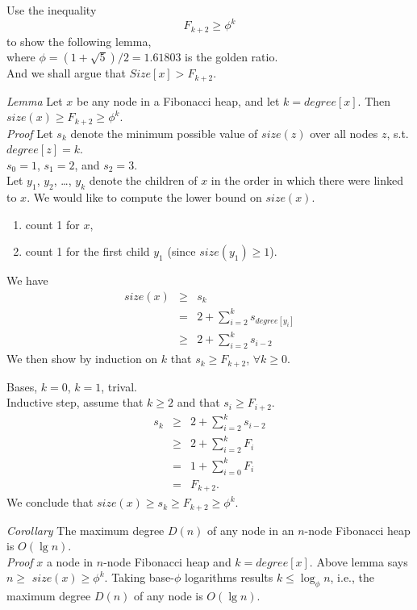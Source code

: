 \documentclass{beamer}
\begin{document}
\begin{frame}{}
Use the inequality $$F_{k+2}\ge \phi^k$$ to show the following lemma, \\
where $\phi=(1+\sqrt{5})/2=1.61803$ is the golden ratio. \\
And we shall argue that $Size[x] > F_{k+2}$.  
\end{frame}

\begin{frame}{}
{\it Lemma} Let $x$ be any node in a Fibonacci heap, and let $k=degree[x]$. Then $size(x) \ge F_{k+2}\ge \phi^k$. \\
{\it Proof} Let $s_k$ denote the minimum possible value of $size(z)$ over all nodes $z$, s.t. $degree[z]=k$. \\
$s_0=1$, $s_1=2$, and $s_2=3$. \\
Let $y_1$, $y_2$, \ldots, $y_k$ denote the children of $x$ in the order in which there were linked to $x$. We would like to compute the 
lower bound on $size(x)$. 
\begin{enumerate}
\item count 1 for $x$,
\item count 1 for the first child $y_1$ (since $size(y_1)\ge 1$). 
\end{enumerate}
\end{frame}

\begin{frame}{}
We have 
\begin{eqnarray}
size(x) &\ge& s_k \\
 & = & 2 + \sum_{i=2}^{k}s_{degree[y_i]} \\
 & \ge & 2 + \sum^k_{i=2}s_{i-2}
\end{eqnarray}
We then show by induction on $k$ that $s_k\ge F_{k+2}$, $\forall k\ge 0$. 
\end{frame}

\begin{frame}{}
Bases, $k=0$, $k=1$, trival. \\
Inductive step, assume that $k\ge 2$ and that $s_i\ge F_{i+2}$. 
\begin{eqnarray}
s_k &\ge& 2 + \sum^k_{i=2}s_{i-2} \\
 &\ge& 2 + \sum^k_{i=2} F_i \\
 & =& 1 + \sum^k_{i=0}F_i \\
 & = & F_{k+2}.
\end{eqnarray}
We conclude that $size(x)\ge s_k\ge F_{k+2}\ge \phi^k$. 
\end{frame}

\begin{frame}{}
\vspace{0.5cm}
{\it Corollary} The maximum degree $D(n)$ of any node in an $n$-node Fibonacci heap is $O(\lg n)$. \\
{\it Proof} $x$ a node in $n$-node Fibonacci heap and $k=degree[x]$. Above lemma says $n\ge$ $size(x) \ge \phi^k$. Taking 
base-$\phi$ logarithms results $k\le \log_\phi n$, i.e., the maximum degree $D(n)$ of any node is $O(\lg n)$. 
\end{frame}
\end{document}
